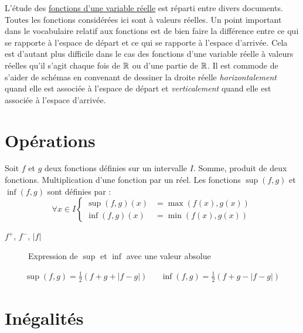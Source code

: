 

L'étude des \href{\baseurl C2063.pdf}{fonctions d'une variable réelle} est réparti entre divers documents.\newline
Toutes les fonctions considérées ici sont à valeurs réelles. Un point important dans le vocabulaire relatif aux fonctions est de bien faire la différence entre ce qui se rapporte à l'espace de départ et ce qui se rapporte à l'espace d'arrivée. Cela est d'autant plus difficile dans le cas des fonctions d'une variable réelle à valeurs réelles qu'il s'agit chaque fois de $\mathbb{R}$ ou d'une partie de $\mathbb{R}$. Il est commode de s'aider de schémas en convenant de dessiner la droite réelle \emph{horizontalement} quand elle est associée à l'espace de départ et \emph{verticalement} quand elle est associée à l'espace d'arrivée.  
\section{Opérations}
\begin{defi}
 Soit $f$ et $g$ deux fonctions définies sur un intervalle $I$. Somme, produit de deux fonctions. Multiplication d'une fonction par un réel.\newline
Les fonctions $\sup(f,g)$ et $\inf(f,g)$ sont définies par :
\begin{displaymath}
 \forall x\in I \left\lbrace
\begin{aligned}
 \sup(f,g)(x) &= \max(f(x),g(x)) \\
 \inf(f,g)(x) &= \min(f(x),g(x))
\end{aligned}
\right. 
\end{displaymath}
\end{defi}
$f^+$, $f^-$, $|f|$
\begin{figure}[h!t]
 \centering

\caption{Expression de $\sup$ et $\inf$ avec une valeur absolue}
\label{fig:C3901_1}
\end{figure}

\begin{prop}
 \begin{align*}
  \sup(f,g)=\frac{1}{2}\left(f + g + |f-g| \right)
& &  
 \inf(f,g)=\frac{1}{2}\left(f + g - |f-g| \right)
 \end{align*}

\end{prop}

\section{Inégalités}
